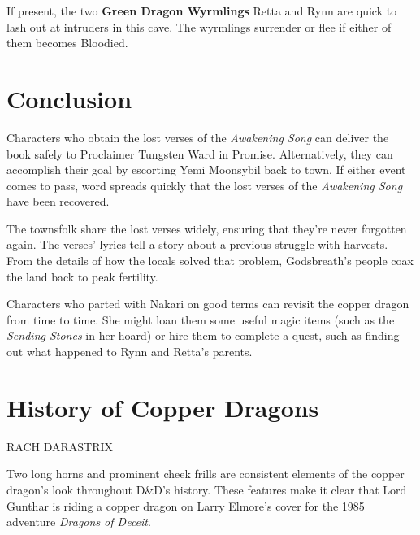 \documentclass[letterpaper, 11pt, twocolumn]{dndbook}
\begin{document}
If present, the two \textbf{Green Dragon Wyrmlings} Retta and Rynn are quick to lash out at intruders in this cave. The wyrmlings surrender or flee if either of them becomes Bloodied.
\section{Conclusion}

Characters who obtain the lost verses of the \textit{Awakening Song} can deliver the book safely to Proclaimer Tungsten Ward in Promise. Alternatively, they can accomplish their goal by escorting Yemi Moonsybil back to town. If either event comes to pass, word spreads quickly that the lost verses of the \textit{Awakening Song} have been recovered.

The townsfolk share the lost verses widely, ensuring that they're never forgotten again. The verses' lyrics tell a story about a previous struggle with harvests. From the details of how the locals solved that problem, Godsbreath's people coax the land back to peak fertility.

Characters who parted with Nakari on good terms can revisit the copper dragon from time to time. She might loan them some useful magic items (such as the \textit{Sending Stones} in her hoard) or hire them to complete a quest, such as finding out what happened to Rynn and Retta's parents.

\section{History of Copper Dragons}

RACH DARASTRIX

\begin{DndReadAloud}
Two long horns and prominent cheek frills are consistent elements of the copper dragon's look throughout D\&D's history. These features make it clear that Lord Gunthar is riding a copper dragon on Larry Elmore's cover for the 1985 adventure \textit{Dragons of Deceit}.
\end{DndReadAloud}





\end{document}
